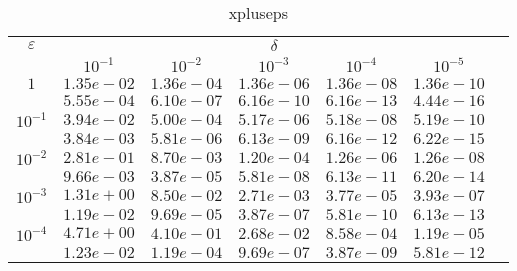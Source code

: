 \documentclass[10pt,twoside]{uz_kgu}
\begin{document}
\begin{table} [!htb]
	\caption {xpluseps}
	\begin{center}
		\begin{tabular}{|c|c|c|c|c|c|c}
			\cline{1-6} $\varepsilon$ & \multicolumn{5}{c|}{$\delta$} \\
			\cline{2-6} &$10^{-1}$ & $10^{-2}$ & $10^{-3}$  & $10^{-4}$& $10^{-5}$\\
			\cline{1-6}
			$1$
			&$1.35e-02$&$1.36e-04$&$1.36e-06$&$1.36e-08$& $1.36e-10$\\
			&$5.55e-04$&$6.10e-07$&$6.16e-10$&$6.16e-13$& $4.44e-16$\\
			\cline{1-6}
			$10^{-1}$
			&$3.94e-02$&$5.00e-04$&$5.17e-06$&$5.18e-08$&$5.19e-10$\\
			&$3.84e-03$&$5.81e-06$&$6.13e-09$&$6.16e-12$&$6.22e-15$\\
			\cline{1-6}
			$10^{-2}$
			&$2.81e-01$&$8.70e-03$&$1.20e-04$&$1.26e-06$&$1.26e-08$\\
			&$9.66e-03$&$3.87e-05$&$5.81e-08$&$6.13e-11$&$6.20e-14$\\
			\cline{1-6}
			$10^{-3}$
			&$1.31e+00$&$8.50e-02$&$2.71e-03$&$3.77e-05$&$3.93e-07$\\
			&$1.19e-02$&$9.69e-05$&$3.87e-07$&$5.81e-10$&$6.13e-13$\\
			\cline{1-6}
			$10^{-4}$
			&$4.71e+00$&$4.10e-01$&$2.68e-02$&$8.58e-04$&$1.19e-05$\\
			&$1.23e-02$&$1.19e-04$&$9.69e-07$&$3.87e-09$&$5.81e-12$\\
			\cline{1-6}
		\end{tabular}
	\end{center}
\end{table}
\end{document}
